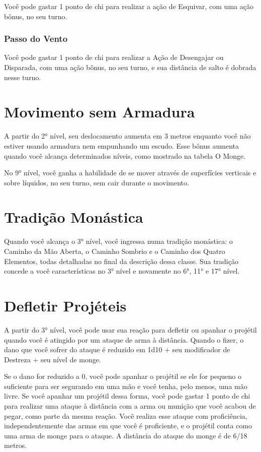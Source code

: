 \begin{multicols}{2}
Você pode gastar 1 ponto de chi para realizar a ação de Esquivar, com uma ação
bônus, no seu turno.

\subsubsection*{Passo do Vento}%
\label{ssub:passo_do_vento}

Você pode gastar 1 ponto de chi para realizar a Ação de Desengajar ou Disparada,
com uma ação bônus, no seu turno, e sua distância de salto é dobrada nesse
turno.

\section*{Movimento sem Armadura}%
\label{sec:movimento_sem_armadura}

A partir do 2° nível, seu deslocamento aumenta em 3 metros enquanto você não
estiver usando armadura nem empunhando um escudo. Esse bônus aumenta quando você
alcança determinados níveis, como mostrado na tabela O Monge.

No 9° nível, você ganha a habilidade de se mover através de superfícies
verticais e sobre líquidos, no seu turno, sem cair durante o movimento.

\section*{Tradição Monástica}%
\label{sec:tradicao_monastica}

Quando você alcança o 3° nível, você ingressa numa tradição monástica: o Caminho
da Mão Aberta, o Caminho Sombrio e o Caminho dos Quatro Elementos, todas
detalhadas no final da descrição dessa classe. Sua tradição concede a você
características no 3° nível e novamente no 6°, 11° e 17° nível.

\section*{Defletir Projéteis}%
\label{sec:defletir_projeteis}

A partir do 3° nível, você pode usar sua reação para defletir ou apanhar o
projétil quando você é atingido por um ataque de arma à distância. Quando o
fizer, o dano que você sofrer do ataque é reduzido em 1d10 + seu modificador de
Destreza + seu nível de monge.

Se o dano for reduzido a 0, você pode apanhar o projétil se ele for pequeno o
suficiente para ser segurando em uma mão e você tenha, pelo menos, uma mão
livre. Se você apanhar um projétil dessa forma, você pode gastar 1 ponto de chi
para realizar uma ataque à distância com a arma ou munição que você acabou de
pegar, como parte da mesma reação. Você realiza esse ataque com proficiência,
independentemente das armas em que você é proficiente, e o projétil conta como
uma arma de monge para o ataque. A distância do ataque do monge é de 6/18
metros.


\end{multicols}
